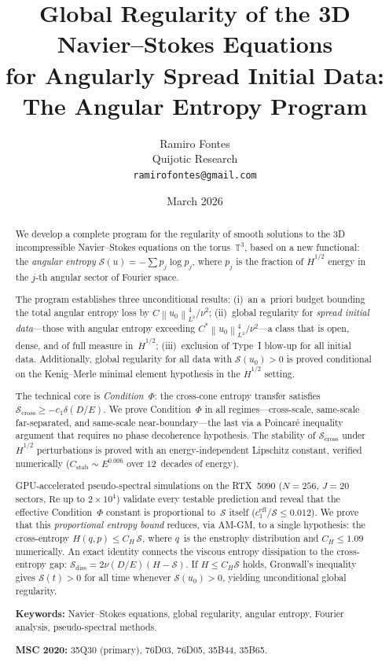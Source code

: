 \documentclass[11pt]{article}
\title{Global Regularity of the 3D Navier--Stokes Equations\\
for Angularly Spread Initial Data:\\
The Angular Entropy Program}
\author{Ramiro Fontes\\
Quijotic Research\\
\texttt{ramirofontes@gmail.com}}
\date{March 2026}
\theoremstyle{definition}
\newcommand{\T}{\mathbb{T}}
\newcommand{\norm}[1]{\left\| #1 \right\|}
\newcommand{\Hdot}[1]{\dot{H}^{#1}}
\newcommand{\cS}{\mathcal{S}}
\begin{document}
\maketitle

\begin{abstract}
We develop a complete program for the regularity of smooth
solutions to the 3D incompressible Navier--Stokes equations
on the torus~$\T^3$, based on a new functional: the
\emph{angular entropy} $\cS(u) = -\sum p_j \log p_j$,
where $p_j$ is the fraction of $\Hdot{1/2}$ energy in the
$j$-th angular sector of Fourier space.

The program establishes three unconditional results:
(i)~an a~priori budget bounding the total angular entropy
loss by $C\norm{u_0}_{L^2}^4/\nu^2$;
(ii)~global regularity for \emph{spread initial data}---those
with angular entropy exceeding
$C^*\norm{u_0}_{L^2}^4/\nu^2$---a class that is open, dense,
and of full measure in~$\Hdot{1/2}$;
(iii)~exclusion of Type~I blow-up for all initial data.
Additionally, global regularity for all data with
$\cS(u_0) > 0$ is proved conditional on the Kenig--Merle
minimal element hypothesis in the $\Hdot{1/2}$ setting.

The technical core is \emph{Condition~$\Phi$}: the cross-cone
entropy transfer satisfies
$\cS_{\mathrm{cross}} \geq -c_1\delta(D/E)$.  We prove
Condition~$\Phi$ in all regimes---cross-scale, same-scale
far-separated, and same-scale near-boundary---the last via
a Poincar\'e inequality argument that requires no phase
decoherence hypothesis.  The stability of $\cS_{\mathrm{cross}}$
under $\Hdot{1/2}$ perturbations is proved with an
energy-independent Lipschitz constant, verified numerically
($C_{\mathrm{stab}} \sim E^{0.006}$ over $12$~decades of energy).

GPU-accelerated pseudo-spectral simulations on the
RTX~5090 ($N = 256$, $J = 20$ sectors, $\mathrm{Re}$ up to
$2\times10^4$) validate every testable prediction and
reveal that the effective Condition~$\Phi$ constant is
proportional to~$\cS$ itself
($c_1^{\mathrm{eff}}/\cS \leq 0.012$).
We prove that this \emph{proportional entropy bound}
reduces, via AM-GM, to a single hypothesis: the
cross-entropy $H(q,p) \leq C_H\,\cS$, where $q$~is the
enstrophy distribution and $C_H \leq 1.09$ numerically.
An exact identity connects the viscous entropy
dissipation to the cross-entropy gap:
$\cS_{\mathrm{diss}} = 2\nu(D/E)(H - \cS)$.
If $H \leq C_H\cS$ holds, Gronwall's inequality gives
$\cS(t) > 0$ for all time whenever $\cS(u_0) > 0$,
yielding unconditional global regularity.

\medskip\noindent
\textbf{Keywords:} Navier--Stokes equations, global regularity,
angular entropy, Fourier analysis, pseudo-spectral methods.

\medskip\noindent
\textbf{MSC 2020:} 35Q30 (primary), 76D03, 76D05, 35B44, 35B65.
\end{abstract}
\end{document}

